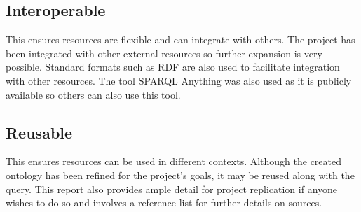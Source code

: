 \subsection{Interoperable}
\hspace{0.5cm} This ensures resources are flexible and can integrate with others. The project has been integrated with other external resources so further expansion is very possible. Standard formats such as RDF are also used to facilitate integration with other resources. The tool SPARQL Anything was also used as it is publicly available so others can also use this tool. 

\subsection{Reusable}
\hspace{0.5cm} This ensures resources can be used in different contexts. Although the created ontology has been refined for the project's goals, it may be reused along with the query. This report also provides ample detail for project replication if anyone wishes to do so and involves a reference list for further details on sources. 

